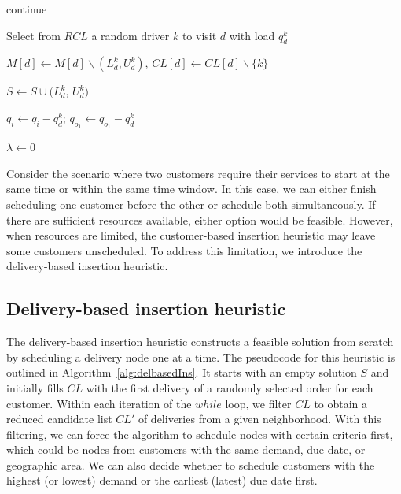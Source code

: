 \documentclass{article}
\begin{document}
{\begin{algorithm}[htpb]
{{{{                continue 

            }
            Select from $RCL$ a random driver $k$ to visit $d$ with load $q^k_d$

            $M[d]\leftarrow M[d] \backslash (L^k_{d}, U^k_{d})$, $CL[d]\leftarrow CL[d] \backslash \{k\} $

            $S \leftarrow S \cup (L^k_{d}$, $U^k_{d})  $

            $q_i \leftarrow q_i-q^k_{d}$;  $q_{o_1} \leftarrow q_{o_1}-q^k_{d}$

            $\lambda \leftarrow 0$

            }
            }
            }

        \end{algorithm}
    }

Consider the scenario where two customers require their services to start at the same time or within the same time window. In this case, we can either finish scheduling one customer before the other or schedule both simultaneously.  If there are sufficient resources available, either option would be feasible. However, when resources are limited, the customer-based insertion heuristic may leave some customers unscheduled. To address this limitation, we introduce the delivery-based insertion heuristic.

\subsection{Delivery-based insertion heuristic}

The delivery-based insertion heuristic constructs a feasible solution from scratch by scheduling a delivery node one at a time. The pseudocode for this heuristic is outlined in Algorithm~\ref{alg:delbasedIns}. It starts with an empty solution $S$ and initially fills $CL$ with the first delivery of a randomly selected order for each customer. Within each iteration of the $while$ loop, we filter $CL$ to obtain a reduced candidate list $CL'$ of deliveries from a given neighborhood. With this filtering, we can force the algorithm to schedule nodes with certain criteria first, which could be nodes from customers with the same demand, due date, or geographic area. We can also decide whether to schedule customers with the highest (or lowest) demand or the earliest (latest) due date first.
\end{document}
